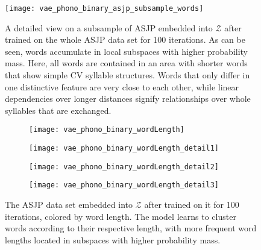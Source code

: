 \documentclass[6pt]{article}
\begin{document}
{\begin{figure}[h] %
   \centering
   \texttt{[image: vae\_phono\_binary\_asjp\_subsample\_words]} 
   \caption{A detailed view on a subsample of ASJP embedded into $\mathcal{Z}$ after trained on the whole ASJP data set for 100 iterations. As can be seen, words accumulate in local subspaces with higher probability mass. Here, all words are contained in an area with shorter words that show simple CV syllable structures. Words that only differ in one distinctive feature are very close to each other, while linear dependencies over longer distances signify relationships over whole syllables that are exchanged.}
   \label{fig:vae_phono_binary_asjp_subsample_words}
\end{figure}

    
    \begin{figure}[ht] 
  \begin{subfigure}[b]{0.5\linewidth}
    \centering
    \texttt{[image: vae\_phono\_binary\_wordLength]} 
    \label{fig:vae_phono_binary_wordLength0} 
    \vspace{4ex}
  \end{subfigure}%
  \begin{subfigure}[b]{0.5\linewidth}
    \centering
    \texttt{[image: vae\_phono\_binary\_wordLength\_detail1]} 
    \label{fig:vae_phono_binary_wordLength1} 
    \vspace{4ex}
  \end{subfigure} 
  \begin{subfigure}[b]{0.5\linewidth}
    \centering
    \texttt{[image: vae\_phono\_binary\_wordLength\_detail2]} 
    \label{fig:vae_phono_binary_wordLength2} 
  \end{subfigure}%
  \begin{subfigure}[b]{0.5\linewidth}
    \centering
    \texttt{[image: vae\_phono\_binary\_wordLength\_detail3]} 
    \label{fig:vae_phono_binary_wordLength3} 
  \end{subfigure} 
  \caption{The ASJP data set embedded into $\mathcal{Z}$ after trained on it for 100 iterations, colored by word length. The model learns to cluster words according to their respective length, with more frequent word lengths located in subspaces with higher probability mass.}
  \label{fig:vae_phono_binary_wordLength} 
\end{figure}

}
\end{document}

